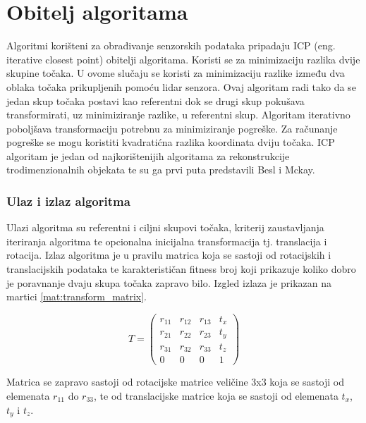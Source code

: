 \section{Obitelj algoritama}

Algoritmi korišteni za obrađivanje senzorskih podataka pripadaju ICP\cite{wiki:Iterative_closest_point} (eng. iterative closest point) obitelji algoritama. Koristi se za minimizaciju razlika dvije skupine točaka. U ovome slučaju se koristi za minimizaciju razlike između dva oblaka točaka prikupljenih pomoću lidar senzora. Ovaj algoritam radi tako da se jedan skup točaka postavi kao referentni dok se drugi skup pokušava transformirati, uz minimiziranje razlike, u referentni skup. Algoritam iterativno poboljšava transformaciju potrebnu za minimiziranje pogreške. Za računanje pogreške se mogu koristiti kvadratićna razlika koordinata dviju točaka. ICP algoritam je jedan od najkorištenijih algoritama za rekonstrukcije trodimenzionalnih objekata te su ga prvi puta predstavili Besl i Mckay\cite{beslmckay121791}.

\subsubsection{Ulaz i izlaz algoritma}

Ulazi algoritma su referentni i ciljni skupovi točaka, kriterij zaustavljanja iteriranja algoritma te opcionalna inicijalna transformacija tj. translacija i rotacija. Izlaz algoritma je u pravilu matrica koja se sastoji od rotacijskih i translacijskih podataka te karakterističan fitness broj koji prikazuje koliko dobro je poravnanje dvaju skupa točaka zapravo bilo. Izgled izlaza je prikazan na martici \ref{mat:transform_matrix}.

\begin{equation}
  T =
  \begin{pmatrix}
    r_{11} & r_{12} & r_{13} & t_{x}\\
    r_{21} & r_{22} & r_{23} & t_{y}\\
    r_{31} & r_{32} & r_{33} & t_{z}\\
    0      & 0      & 0      & 1
  \end{pmatrix}
  \label{mat:transform_matrix}
\end{equation}

Matrica se zapravo sastoji od rotacijske matrice veličine 3x3 koja se sastoji od elemenata $r_{11}$ do $r_{33}$, te od translacijske matrice koja se sastoji od elemenata $t_{x}$, $t_{y}$ i $t_{z}$. 

